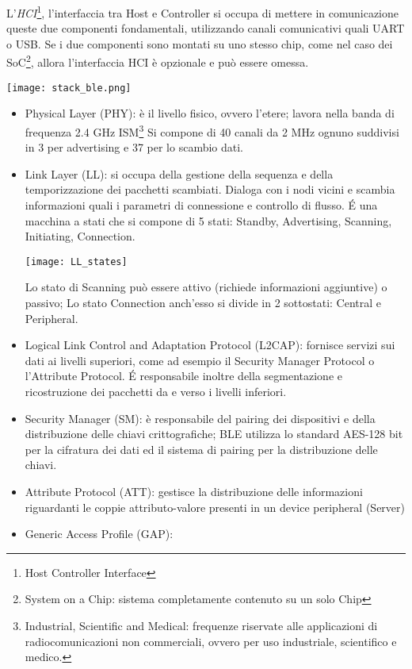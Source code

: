 L'\emph{HCI}\footnote{Host Controller Interface}, l'interfaccia tra Host e Controller si occupa di mettere in comunicazione queste due componenti fondamentali, utilizzando canali comunicativi quali UART o USB.
Se i due componenti sono montati su uno stesso chip, come nel caso dei SoC\footnote{System on a Chip: sistema completamente contenuto su un solo Chip}, allora l'interfaccia HCI è opzionale e può essere omessa.

\texttt{[image: stack\_ble.png]}

\begin{itemize}
\item Physical Layer (PHY): è il livello fisico, ovvero l'etere; lavora nella banda di frequenza 2.4 GHz ISM\footnote{Industrial, Scientific and Medical: frequenze riservate alle applicazioni di radiocomunicazioni non commerciali, ovvero per uso industriale, scientifico e medico.} Si compone di 40 canali da 2 MHz ognuno suddivisi in 3 per advertising e 37 per lo scambio dati.

\item Link Layer (LL): si occupa della gestione della sequenza e della temporizzazione dei pacchetti scambiati. Dialoga con i nodi vicini e scambia informazioni quali i parametri di connessione e controllo di flusso.\linebreak 
\'E una macchina a stati che si compone di 5 stati: Standby, Advertising, Scanning, Initiating, Connection. 

\texttt{[image: LL\_states]}

Lo stato di Scanning può essere attivo (richiede informazioni aggiuntive) o passivo; Lo stato Connection anch'esso si divide in 2 sottostati: Central e Peripheral.

\item Logical Link Control and Adaptation Protocol (L2CAP): fornisce servizi sui dati ai livelli superiori, come ad esempio il Security Manager Protocol o l'Attribute Protocol. \'E responsabile inoltre della segmentazione e ricostruzione dei pacchetti da e verso i livelli inferiori.

\item Security Manager (SM): è responsabile del pairing dei dispositivi e della distribuzione delle chiavi crittografiche; BLE utilizza lo standard AES-128 bit per la cifratura dei dati ed il sistema di pairing per la distribuzione delle chiavi.

\item Attribute Protocol (ATT): gestisce la distribuzione delle informazioni riguardanti le coppie attributo-valore presenti in un device peripheral (Server)

\item Generic Access Profile (GAP): 
\end{itemize}



